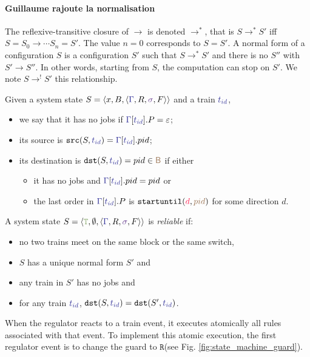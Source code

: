 \documentclass[runningheads]{llncs}
\newcommand{\tuple}[1]{\ensuremath{\langle #1\rangle}}
\newcommand{\dirFmt}[1]{{\color{dircolor} #1}}
\newcommand{\posFmt}[1]{{\color{poscolor}{#1}}}
\newcommand{\blocks}{{\posFmt{\mathsf{B}}}}
\newcommand{\swFmt}[1]{{\color{swcolor}{#1}}}
\newcommand{\switches}{\ensuremath{\swFmt{\sigma}}}
\newcommand{\trainFmt}[1]{{\color{traincolor} #1}}
\newcommand{\trainSeq}{\trainFmt{\Gamma\xspace}}
\newcommand{\tid}[1]{\ensuremath{\trainFmt{t_{#1}}}}
\newcommand{\su}[2]{{\mbox{$\mathtt{startuntil}(\dirFmt{#1}, \posFmt{#2})$}}\xspace}
\newcommand{\emptyTrainProg}{\varepsilon}
\newcommand{\regulator}{\ensuremath{R}}
\newcommand{\signals}{\ensuremath{F}}
\newcommand{\stateTuple}[4]{\tuple{#1, #2, #3, #4}}
\newcommand{\guardFmt}[1]{{\color{guardcolor} \ensuremath{\mathtt{#1}}}}
\newcommand{\guardT}{\guardFmt{T}}
\newcommand{\guardR}{\guardFmt{R}}
\newcommand{\reduces}{\ensuremath{\rightarrow}}
\newcommand{\redTuple}[3]{\ensuremath{\tuple{#1, #2, #3}}}
\begin{document}
\paragraph{Guillaume rajoute la normalisation}

The reflexive-transitive closure of $\reduces$ is denoted $\reduces^*$, that is $S \reduces^* S'$ iff $S =S_0 \reduces \cdots S_n = S'$. The value $n = 0$ corresponds to $S = S'$.  A normal form of a configuration $S$ is a configuration $S'$ such that $S \reduces^* S'$ and there is no $S''$ with $S' \reduces S''$. In other words, starting from $S$, the computation can stop on $S'$. We note $S \reduces^! S'$ this relationship.

Given a system state  $S = \redTuple{x}{B}{\stateTuple{\trainSeq{}}{\regulator}{\switches}{\signals}}$ and a train $\tid{id}$, 
\begin{itemize}
\item   we say that it has no jobs if  $\trainSeq{}[\tid{id}].P = \emptyTrainProg$;
\item its source is $\mathtt{src}(S, \tid{id}) = \trainSeq{}[\tid{id}].pid$;
\item its destination is $\mathtt{dst}(S, \tid{id}) = pid \in \blocks $ if either
\begin{itemize}
\item  it has no jobs and  $\trainSeq{}[\tid{id}].pid = pid$  or
\item  the last order in  $\trainSeq{}[\tid{id}].P$ is $\su{d}{pid}$ for some direction $d$.
\end{itemize}
\end{itemize}

A system state $S = \redTuple{\guardT}{\emptyset}{\stateTuple{\trainSeq{}}{\regulator}{\switches}{\signals}} $  is \emph{reliable} if: 
\begin{itemize}
\item  no two trains meet on the same block or the same switch, 
\item $S$ has  a unique normal form $S'$ and 
\item any train in $S'$ has no jobs and 
\item for any train $\tid{id}$, $\mathtt{dst}(S, \tid{id}) =  \mathtt{dst}(S', \tid{id})$. 
\end{itemize}


When the regulator reacts to a train event, it executes atomically all rules associated with that event. To implement this atomic execution, the first regulator event is to change the guard to \guardR (see Fig. \ref{fig:state_machine_guard}).
\end{document}
